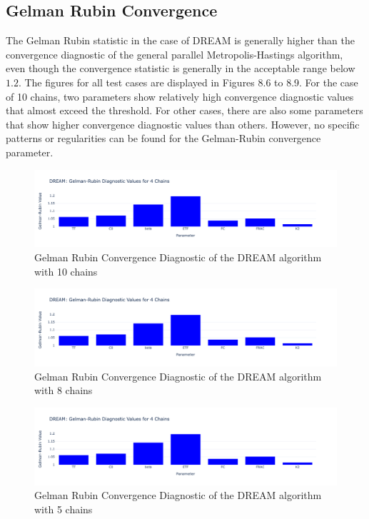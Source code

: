 \subsection{Gelman Rubin Convergence}
The Gelman Rubin statistic in the case of DREAM is generally higher than the convergence diagnostic of the general parallel Metropolis-Hastings algorithm, even though the convergence statistic is generally in the acceptable range below $1.2$. The figures for all test cases are displayed in Figures 8.6 to 8.9. For the case of 10 chains, two parameters show relatively high convergence diagnostic values that almost exceed the threshold. For other cases, there are also some parameters that show higher convergence diagnostic values than others. However, no specific patterns or regularities can be found for the Gelman-Rubin convergence parameter. 

\begin{figure}[H]
    \centering
    \includegraphics[width=1\textwidth]{figures/dream/gr_10.png}
    \captionsetup{width=.8\textwidth}
    \caption{Gelman Rubin Convergence Diagnostic of the DREAM algorithm with 10 chains}
    \label{fig:enter-label}
\end{figure}

\begin{figure}[H]
    \centering
    \includegraphics[width=1\textwidth]{figures/dream/gr_8.png}
    \captionsetup{width=.8\textwidth}
    \caption{Gelman Rubin Convergence Diagnostic of the DREAM algorithm with 8 chains}
    \label{fig:enter-label}
\end{figure}

\begin{figure}[H]
    \centering
    \includegraphics[width=1\textwidth]{figures/dream/gr_5.png}
    \captionsetup{width=.8\textwidth}
    \caption{Gelman Rubin Convergence Diagnostic of the DREAM algorithm with 5 chains}
    \label{fig:enter-label}
\end{figure}

